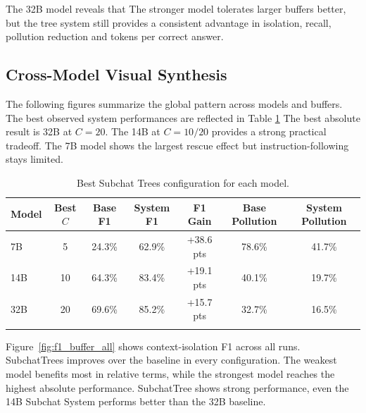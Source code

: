 \documentclass[pdflatex,sn-mathphys-num]{sn-jnl}%
\theoremstyle{thmstyleone}%
\theoremstyle{thmstyletwo}%
\theoremstyle{thmstylethree}%
\begin{document}
The 32B model reveals that The stronger model tolerates larger buffers better, but the tree system still provides a consistent advantage in isolation, recall, pollution reduction and tokens per correct answer.







\subsection{Cross-Model Visual Synthesis}\label{subsec:cross_model_visuals}

 The following figures summarize the global pattern across models and buffers. The best observed system performances are reflected in Table \ref{tab:best_by_model} The best absolute result is 32B at $C=20$. The 14B at $C=10/20$ provides a strong practical tradeoff. The 7B model shows the largest rescue effect but instruction-following stays limited.

\begin{table}[htbp]
\caption{Best Subchat Trees configuration for each model.}\label{tab:best_by_model}
\centering
\scriptsize
\begin{tabular*}{\textwidth}{@{\extracolsep\fill}lcccccc@{}}
\toprule
\textbf{Model} & \textbf{Best $C$} & \textbf{Base F1} & \textbf{System F1} & \textbf{F1 Gain} & \textbf{Base Pollution} & \textbf{System Pollution} \\
\midrule
7B & 5 & 24.3\% & 62.9\% & +38.6 pts & 78.6\% & 41.7\% \\
14B & 10 & 64.3\% & 83.4\% & +19.1 pts & 40.1\% & 19.7\% \\
32B & 20 & 69.6\% & 85.2\% & +15.7 pts & 32.7\% & 16.5\% \\
\botrule
\end{tabular*}
\end{table}

Figure~\ref{fig:f1_buffer_all} shows context-isolation F1 across all runs. SubchatTrees improves over the baseline in every configuration. The weakest model benefits most in relative terms, while the strongest model reaches the highest absolute performance. SubchatTree shows strong performance, even the 14B Subchat System performs better than the 32B baseline.
\end{document}
